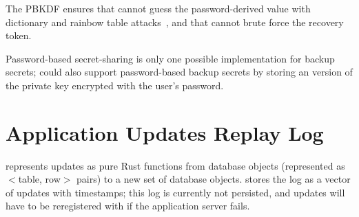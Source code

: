 The PBKDF ensures that \sys cannot guess the password-derived value with
dictionary and rainbow table attacks~\cite{pbkdf}, and that \sys cannot brute force
the recovery token.
%
%

%
%


%
Password-based secret-sharing is only one possible implementation for backup
secrets; \sys could also support password-based backup secrets by \eg storing an
version of the private key encrypted with the user's password.
%

\section{Application Updates Replay Log}
\sys represents updates as pure Rust functions from database objects (represented as
$<$table, row$>$ pairs) to a new set of database objects. \sys stores the log as
a vector of updates with timestamps; this log is currently not persisted, and
updates will have to be reregistered with \sys if the application server fails.

